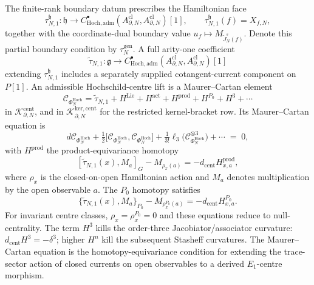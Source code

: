 \documentclass[11pt]{memoir}
\begin{document}
\begin{defn}
  The finite-rank boundary datum prescribes the Hamiltonian face
  \[
    \tau_{N,1}^{\mathfrak h}\colon\mathfrak h\longrightarrow
    C^\bullet_{\mathrm{Hoch},\mathrm{adm}}
      (A^{\mathrm{cl}}_{\partial,N},A^{\mathrm{cl}}_{\partial,N})[1],
    \qquad \tau_{N,1}^{\mathfrak h}(f)=X_{f,N},
  \]
  together with the coordinate-dual boundary value
  \(u_f\mapsto M_{\widetilde J_N^s(f)}\).  Denote this partial boundary condition
  by \(\tau_N^{\mathrm{gen}}\).  A full arity-one coefficient
  \[
    \widetilde\tau_{N,1}\colon\mathfrak g\longrightarrow
    C^\bullet_{\mathrm{Hoch},\mathrm{adm}}
      (A^{\mathrm{cl}}_{\partial,N},A^{\mathrm{cl}}_{\partial,N})[1]
  \]
  extending \(\tau_{N,1}^{\mathfrak h}\) includes a separately supplied
  cotangent-current component on \(P[1]\).  An admissible
  Hochschild-centre lift is a Maurer--Cartan element
  \[
    \mathcal C_{\Phi_N^{\mathrm{Hoch}}}
    =\widetilde\tau_{N,1}
      +H^{\mathrm{Lie}}+H^{\mathrm{act}}+H^{\mathrm{prod}}
      +H^{P_0}+H^3+\cdots
  \]
  in \(\mathcal K^{\mathrm{cent}}_{\partial,N}\), and in
  \(\mathcal K^{\mathrm{ker,cent}}_{\partial,N}\) for the restricted
  kernel-bracket row.  Its Maurer--Cartan equation is
  \[
    d\mathcal C_{\Phi_N^{\mathrm{Hoch}}}
    +\tfrac12\bigl[\mathcal C_{\Phi_N^{\mathrm{Hoch}}},
                   \mathcal C_{\Phi_N^{\mathrm{Hoch}}}\bigr]
    +\tfrac{1}{3!}\ell_3\!\bigl(
      \mathcal C_{\Phi_N^{\mathrm{Hoch}}}^{\otimes 3}\bigr)
    +\cdots\;=\;0,
  \]
  with \(H^{\mathrm{prod}}\) the product-equivariance homotopy
  \[
    [\widetilde\tau_{N,1}(x),M_a]_G-M_{\rho_x(a)}
      =-d_{\mathrm{cent}}H^{\mathrm{prod}}_{x,a},
  \]
  where \(\rho_x\) is the closed-on-open Hamiltonian action and
  \(M_a\) denotes multiplication by the open observable \(a\).  The
  \(P_0\) homotopy satisfies
  \[
    \{\widetilde\tau_{N,1}(x),M_a\}_{P_0}
      -M_{\rho_x^{P_0}(a)}
      =-d_{\mathrm{cent}}H^{P_0}_{x,a}.
  \]
  For invariant centre classes, \(\rho_x=\rho_x^{P_0}=0\) and these
  equations reduce to null-centrality.  The term \(H^3\) kills the
  order-three Jacobiator/associator curvature:
  \(d_{\mathrm{cent}}H^3=-\delta^3\); higher \(H^n\) kill the subsequent
  Stasheff curvatures.  The Maurer--Cartan
  equation is the homotopy-equivariance condition for extending the
  trace-sector action of closed currents on open observables to a
  derived \(E_1\)-centre morphism.
\end{defn}
\end{document}
